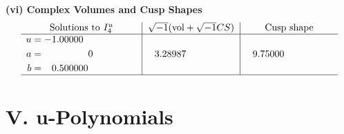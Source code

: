 \documentclass[1p]{elsarticle_modified}
\theoremstyle{definition}
\newcommand{\I}{\sqrt{-1}}
\begin{document}
\newpage\flushleft \textbf{(vi) Complex Volumes and Cusp Shapes}
$$\begin{array}{c|c|c}  
\text{Solutions to }I^u_{4}& \I (\text{vol} + \sqrt{-1}CS) & \text{Cusp shape}\\
 \hline 
\begin{aligned}
u &= -1.00000\phantom{ +0.000000I} \\
a &= \phantom{-0.000000 } 0 \\
b &= \phantom{-}0.500000\phantom{ +0.000000I}\end{aligned}
 & \phantom{-}3.28987\phantom{ +0.000000I} & \phantom{-}9.75000\phantom{ +0.000000I}\\
 \hline 
 \end{array}$$\newpage
\newpage\renewcommand{\arraystretch}{1}
\centering \section*{ V. u-Polynomials}
\end{document}
